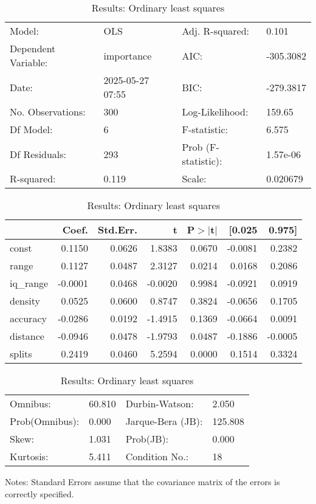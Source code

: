 \begin{table}
\caption{Results: Ordinary least squares}
\label{}
\begin{center}
\begin{tabular}{llll}
\hline
Model:              & OLS              & Adj. R-squared:     & 0.101      \\
Dependent Variable: & importance       & AIC:                & -305.3082  \\
Date:               & 2025-05-27 07:55 & BIC:                & -279.3817  \\
No. Observations:   & 300              & Log-Likelihood:     & 159.65     \\
Df Model:           & 6                & F-statistic:        & 6.575      \\
Df Residuals:       & 293              & Prob (F-statistic): & 1.57e-06   \\
R-squared:          & 0.119            & Scale:              & 0.020679   \\
\hline
\end{tabular}
\end{center}

\begin{center}
\begin{tabular}{lrrrrrr}
\hline
          &   Coef. & Std.Err. &       t & P$> |$t$|$ &  [0.025 &  0.975]  \\
\hline
const     &  0.1150 &   0.0626 &  1.8383 &      0.0670 & -0.0081 &  0.2382  \\
range     &  0.1127 &   0.0487 &  2.3127 &      0.0214 &  0.0168 &  0.2086  \\
iq\_range & -0.0001 &   0.0468 & -0.0020 &      0.9984 & -0.0921 &  0.0919  \\
density   &  0.0525 &   0.0600 &  0.8747 &      0.3824 & -0.0656 &  0.1705  \\
accuracy  & -0.0286 &   0.0192 & -1.4915 &      0.1369 & -0.0664 &  0.0091  \\
distance  & -0.0946 &   0.0478 & -1.9793 &      0.0487 & -0.1886 & -0.0005  \\
splits    &  0.2419 &   0.0460 &  5.2594 &      0.0000 &  0.1514 &  0.3324  \\
\hline
\end{tabular}
\end{center}

\begin{center}
\begin{tabular}{llll}
\hline
Omnibus:       & 60.810 & Durbin-Watson:    & 2.050    \\
Prob(Omnibus): & 0.000  & Jarque-Bera (JB): & 125.808  \\
Skew:          & 1.031  & Prob(JB):         & 0.000    \\
Kurtosis:      & 5.411  & Condition No.:    & 18       \\
\hline
\end{tabular}
\end{center}
\end{table}
\bigskip
Notes: \newline 
[1] Standard Errors assume that the covariance matrix of the errors is correctly specified.